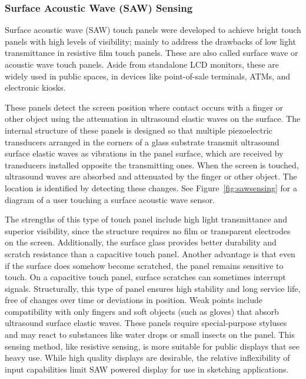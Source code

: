 \subsubsection{Surface Acoustic Wave (SAW) Sensing}

Surface acoustic wave (SAW) touch panels were developed to achieve bright touch panels with high levels of visibility; mainly to address the drawbacks of low light transmittance in resistive film touch panels. 
These are also called surface wave or acoustic wave touch panels. 
Aside from standalone LCD monitors, these are widely used in public spaces, in devices like point-of-sale terminals, ATMs, and electronic kiosks.

These panels detect the screen position where contact occurs with a finger or other object using the attenuation in ultrasound elastic waves on the surface. 
The internal structure of these panels is designed so that multiple piezoelectric transducers arranged in the corners of a glass substrate transmit ultrasound surface elastic waves as vibrations in the panel surface, which are received by transducers installed opposite the transmitting ones. 
When the screen is touched, ultrasound waves are absorbed and attenuated by the finger or other object. 
The location is identified by detecting these changes.
See Figure~\ref{fig:sawsensing} for a diagram of a user touching a surface acoustic wave sensor.



The strengths of this type of touch panel include high light transmittance and superior visibility, since the structure requires no film or transparent electrodes on the screen. 
Additionally, the surface glass provides better durability and scratch resistance than a capacitive touch panel. 
Another advantage is that even if the surface does somehow become scratched, the panel remains sensitive to touch. 
On a capacitive touch panel, surface scratches can sometimes interrupt signals. 
Structurally, this type of panel ensures high stability and long service life, free of changes over time or deviations in position.
Weak points include compatibility with only fingers and soft objects (such as gloves) that absorb ultrasound surface elastic waves. 
These panels require special-purpose styluses and may react to substances like water drops or small insects on the panel.
This sensing method, like resistive sensing, is more suitable for public displays that see heavy use.
While high quality displays are desirable, the relative inflexibility of input capabilities limit SAW powered display for use in sketching applications.




